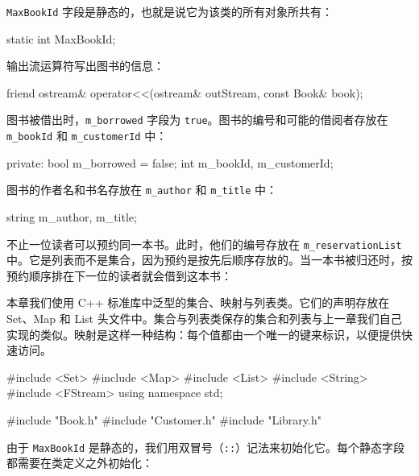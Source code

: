 \texttt{MaxBookId} 字段是静态的，也就是说它为该类的所有对象所共有：

\begin{codebox}
    static int MaxBookId;
\end{codebox}

输出流运算符写出图书的信息：

\begin{codebox}
    friend ostream& operator<<(ostream& outStream,
                               const Book& book);
\end{codebox}

图书被借出时，\texttt{m\_borrowed} 字段为 \texttt{true}。图书的编号和可能的借阅者存放在 \texttt{m\_bookId} 和 \texttt{m\_customerId} 中：

\begin{codebox}
    private:
      bool m_borrowed = false;
      int m_bookId, m_customerId;
\end{codebox}

图书的作者名和书名存放在 \texttt{m\_author} 和 \texttt{m\_title} 中：

\begin{codebox}
      string m_author, m_title;
\end{codebox}

不止一位读者可以预约同一本书。此时，他们的编号存放在 \texttt{m\_reservationList} 中。它是列表而不是集合，因为预约是按先后顺序存放的。当一本书被归还时，按预约顺序排在下一位的读者就会借到这本书：

\begin{codebox}
      list<int> m_reservationList;
      };
\end{codebox}

本章我们使用 C++ 标准库中泛型的集合、映射与列表类。它们的声明存放在 Set、Map 和 List 头文件中。集合与列表类保存的集合和列表与上一章我们自己实现的类似。映射是这样一种结构：每个值都由一个唯一的键来标识，以便提供快速访问。

\medskip{}

\begin{codebox}
#include <Set>
#include <Map>
#include <List>
#include <String>
#include <FStream>
using namespace std;

#include "Book.h"
#include "Customer.h"
#include "Library.h"
\end{codebox}

由于 \texttt{MaxBookId} 是静态的，我们用双冒号（\texttt{::}）记法来初始化它。每个静态字段都需要在类定义之外初始化：

